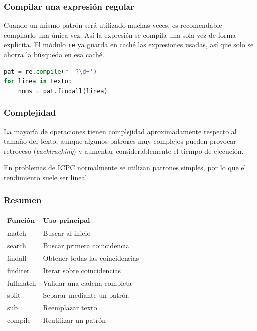\vspace{0.3cm}

\subsubsection{Compilar una expresión regular}

Cuando un mismo patrón será utilizado muchas veces, es recomendable compilarlo una única vez.
Así la expresión se compila una sola vez de forma explícita. El módulo \texttt{re} ya guarda en caché las expresiones usadas, así que solo se ahorra la búsqueda en esa caché.

\begin{lstlisting}[language=Python]
pat = re.compile(r'-?\d+')
for linea in texto:
    nums = pat.findall(linea)
\end{lstlisting}

\vspace{0.3cm}

\subsubsection{Complejidad}

La mayoría de operaciones tienen complejidad aproximadamente 
respecto al tamaño del texto, aunque algunos patrones muy complejos pueden provocar retroceso (\textit{backtracking}) y aumentar considerablemente el tiempo de ejecución.

En problemas de ICPC normalmente se utilizan patrones simples, por lo que el rendimiento suele ser lineal.

\vspace{0.3cm}

\subsubsection*{Resumen}

\begin{center}
\begin{tabular}{|l|l|}
\hline
Función & Uso principal \\ \hline
match & Buscar al inicio \\ \hline
search & Buscar primera coincidencia \\ \hline
findall & Obtener todas las coincidencias \\ \hline
finditer & Iterar sobre coincidencias \\ \hline
fullmatch & Validar una cadena completa \\ \hline
split & Separar mediante un patrón \\ \hline
sub & Reemplazar texto \\ \hline
compile & Reutilizar un patrón \\ \hline
\end{tabular}
\end{center}

